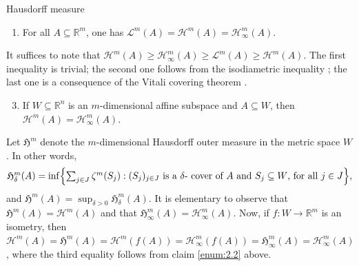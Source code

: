 \documentclass[JEP,XML,SOM,Unicode,ThmDefs,NoEqCountersInSection]{cedram}
\newenvironment{Empty}[2][\null]{%
\begin{enonce}[remark]{#1}#2}
{\end{enonce}}
\newcommand{\R}{\mathbb{R}}
\newcommand{\Rm}{\R^m}
\newcommand{\Rn}{\R^n}
\newcommand{\calH}{\mathscr{H}}
\newcommand{\calL}{\mathscr{L}}
\newcommand{\frH}{\mathfrak{H}}
\let\subset\subseteq
\begin{document}
\begin{Empty}[Hausdorff measure]
{\begin{enumerate}
\item\label{enum:2.2} For all $A \subset \Rm$, one has $\calL^m(A) = \calH^m(A) = \calH^m_\infty(A)$.
\end{enumerate}
}
\par
It suffices to note that $\calH^m(A) \geq \calH^m_\infty(A) \geq \calL^m(A) \geq \calH^m(A)$.
The first inequality is trivial; the second one follows from the isodiametric inequality \cite[2.10.33]{GMT}; the last one is a consequence of the Vitali covering theorem \cite[Chap.\,2, \S 2, Th.\,2]{EVANS.GARIEPY}.
\par
{\it
\begin{enumerate}\setcounter{enumi}{2}
\item\label{enum:2.3} If $W \subset \Rn$ is an $m$-dimensional affine subspace and $A \subset W$, then $\calH^m(A) = \calH^m_\infty(A)$.
\end{enumerate}
}
\par
Let $\frH^m$ denote the $m$-dimensional Hausdorff outer measure in the metric space $W$.
In other words,
\begin{equation*}\textstyle
\frH^m_\delta(A) = \inf \Bigl\{ \sum_{j \in J} \zeta^m(S_j): (S_j)_{j \in J} \text{ is a $\delta$- cover of $A$ and $S_j \subset W$, for all $j \in J$}\Bigr\},
\end{equation*}
and $\frH^m(A) = \sup_{\delta > 0} \frH^m_\delta(A)$.
It is elementary to observe that $\frH^m(A) = \calH^m(A)$ and that $\frH^m_\infty(A) = \calH^m_\infty(A)$.
Now, if $f: W \to \Rm$ is an isometry, then $\calH^m(A) = \frH^m(A) = \calH^m(f(A)) = \calH^m_\infty(f(A)) = \frH^m_\infty(A) = \calH^m_\infty(A)$, where the third equality follows from claim \eqref{enum:2.2} above.
\end{Empty}
\end{document}
